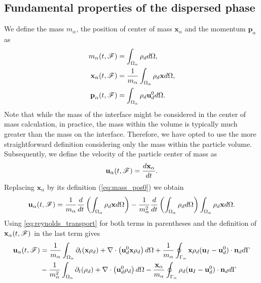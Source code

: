  \subsection{Fundamental properties of the dispersed phase}
We define the mass $m_\alpha$, the position of center of mass $\mathbf{x}_\alpha$ and the momentum $\textbf{p}_\alpha$ as
\begin{align}
    m_\alpha(t,\mathscr{F})
    &= \int_{\Omega_{\alpha}}  \rho_d   d\Omega, 
    \\
    \textbf{x}_\alpha(t,\mathscr{F})
    &= \frac{1}{m_\alpha }\int_{\Omega_{\alpha}}  \rho_d \textbf{x}  d\Omega     \label{eq:mass_pos0},
    \\ \textbf{p}_\alpha(t,\mathscr{F})
    &= \int_{\Omega_{\alpha}}  \rho_d \textbf{u}_d^0  d\Omega.
\end{align}
Note that while the mass of the interface might be considered in the center of mass calculation, in practice, the mass within the volume is typically much greater than the mass on the interface. 
Therefore, we have opted to use the more straightforward definition considering only the mass within the particle volume.
Subsequently, we define the velocity of the particle center of mass as
\begin{equation}
\textbf{u}_\alpha(t,\mathscr{F}) = \frac{d \textbf{x}_\alpha}{dt}.
\end{equation}
Replacing $\textbf{x}_\alpha$ by its definition (\ref{eq:mass_pos0}) we obtain
\begin{equation}
    \textbf{u}_\alpha(t,\mathscr{F}) = \frac{1}{m_\alpha}
    \frac{d}{dt} 
    \left(
        \int_{\Omega_{\alpha}}  \rho_d \textbf{x}  d\Omega
    \right)
    - \frac{1}{m_\alpha^2} \frac{d}{dt} \left(\int_{\Omega_{\alpha}}  \rho_d  d\Omega \right)
    \int_{\Omega_{\alpha}}  \rho_d \textbf{x}  d\Omega.
\end{equation}
Using \ref{eq:reynolds_transport} for both terms in parentheses and the definition of $\textbf{x}_\alpha(t,\mathscr{F})$ in the last term gives
\begin{align}
    \textbf{u}_\alpha(t,\mathscr{F}) &=  \frac{1}{m_\alpha}\int_{\Omega_{\alpha}} 
        \partial_t (\textbf{x}\rho_d ) + \mathbf{\nabla}\cdot\left(\textbf{u}_d^0 \textbf{x} \rho_d\right) 
     d\Omega 
    + \frac{1}{m_\alpha}\oint_{\Gamma_{\alpha}}  \textbf{x} \rho_d(\textbf{u}_I - \textbf{u}_d^0) \cdot \textbf{n}_d  d\Gamma \nonumber\\
    & - \frac{1}{m_\alpha^2}\int_{\Omega_{\alpha}} 
        \partial_t (\rho_d ) + \mathbf{\nabla}\cdot\left(\textbf{u}_d^0 \rho_d\right) 
     d\Omega -  \frac{\textbf{x}_\alpha}{m_\alpha}    \oint_{\Gamma_{\alpha}}  \rho_d(\textbf{u}_I   - \textbf{u}_d^0) \cdot \textbf{n}_d  d\Gamma
    \label{eq:u_alpha}
\end{align}

